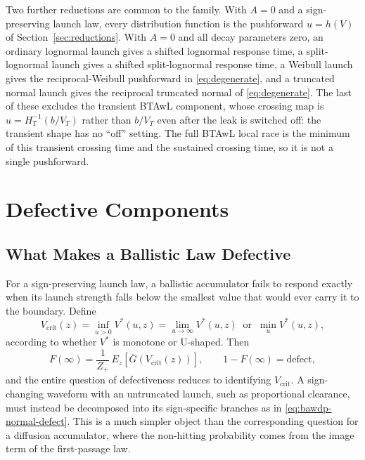 \documentclass[12pt]{article}
\newcommand{\Gbar}{\bar{G}}
\theoremstyle{remark}
\begin{document}
\begin{center}
\smallskip
Two further reductions are common to the family. With $A=0$ and a
sign-preserving launch law, every distribution function is the pushforward
$u=h(V)$ of Section~\ref{sec:reductions}. With $A=0$ and all decay parameters
zero, an ordinary lognormal launch gives a shifted lognormal response time, a
split-lognormal launch gives a shifted split-lognormal response time, a Weibull
launch gives the reciprocal-Weibull pushforward in \eqref{eq:degenerate}, and a
truncated normal launch gives the reciprocal truncated normal of
\eqref{eq:degenerate}. The last of these excludes the transient BTAwL component,
whose crossing map is $u=H_T^{-1}(b/V_T)$ rather than $b/V_T$ even after the
leak is switched off: the transient shape has no ``off'' setting.  The full
BTAwL local race is the minimum of this transient crossing time and the
sustained crossing time, so it is not a single pushforward.
\end{center}

\section{Defective Components}
\label{sec:defect}
\subsection{What Makes a Ballistic Law Defective}
For a sign-preserving launch law, a ballistic accumulator fails to respond exactly when its launch strength falls below the smallest value that would ever carry it to the boundary. Define
\begin{equation}
  V_{\mathrm{crit}}(z) = \inf_{u > 0} V^{*}(u,z)
  = \lim_{u \to \infty} V^{*}(u,z)
    \ \text{ or }\
    \min_{u} V^{*}(u,z),
\end{equation}
according to whether $V^{*}$ is monotone or U-shaped. Then
\begin{equation}
  F(\infty) = \frac{1}{Z_+}\,E_z\!\left[\Gbar\!\left(
      V_{\mathrm{crit}}(z)\right)\right],
  \qquad
  1 - F(\infty) = \text{defect},
  \label{eq:generic-defect}
\end{equation}
and the entire question of defectiveness reduces to identifying $V_{\mathrm{crit}}$. A sign-changing waveform with an untruncated launch, such as proportional clearance, must instead be decomposed into its sign-specific branches as in \eqref{eq:bawdp-normal-defect}. This is a much simpler object than the corresponding question for a diffusion accumulator, where the non-hitting probability comes from the image term of the first-passage law.
\end{document}
